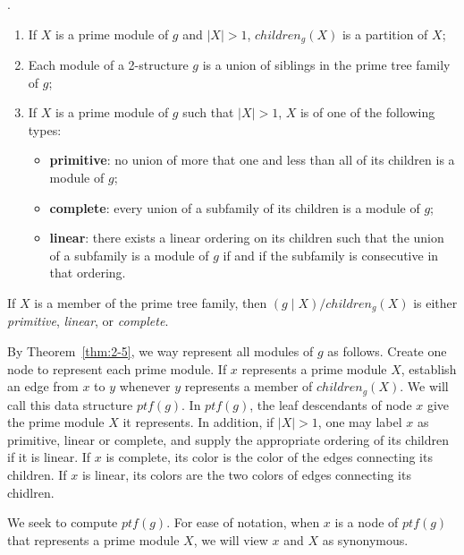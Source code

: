 \begin{mytheo}
    \label{thm:2-5}
    .\\
    \begin{enumerate}
        \item If $X$ is a prime module of $g$ and $\mid X \mid > 1$, $children_g(X)$ is a partition of $X$;
        \item Each module of a 2-structure $g$ is a union of siblings in the prime tree family of $g$;
        \item If $X$ is a prime module of $g$ such that $\mid X \mid > 1$, $X$ is of one of the following types:
            \begin{itemize}
                \item \textbf{primitive}: no union of more that one and less than all of its children is a module of $g$;
                \item \textbf{complete}: every union of a subfamily of its children is a module of $g$;
                \item \textbf{linear}: there exists a linear ordering on its children such that the union of a subfamily is a module of $g$ if and if the subfamily is consecutive in that ordering.
            \end{itemize}
    \end{enumerate}
\end{mytheo}

\begin{mycor}
    \label{cor:2}
    If $X$ is a member of the prime tree family, then $(g \mid X) / children_g(X)$ is either \textit{primitive}, \textit{linear}, or \textit{complete}.
\end{mycor}

By Theorem~\ref{thm:2-5}, we way represent all modules of $g$ as follows.
Create one node to represent each prime module.
If $x$ represents a prime module $X$, establish an edge from $x$ to $y$ whenever $y$ represents a member of $children_g(X)$.
We will call this data structure $ptf(g)$.
In $ptf(g)$, the leaf descendants of node $x$ give the prime module $X$ it represents.
In addition, if $\mid X \mid > 1$, one may label $x$ as primitive, linear or complete, and supply the appropriate ordering of its children if it is linear.
If $x$ is complete, its color is the color of the edges connecting its children.
If $x$ is linear, its colors are the two colors of edges connecting its chidlren.

We seek to compute $ptf(g)$.
For ease of notation, when $x$ is a node of $ptf(g)$ that represents a prime module $X$, we will view $x$ and $X$ as synonymous.



